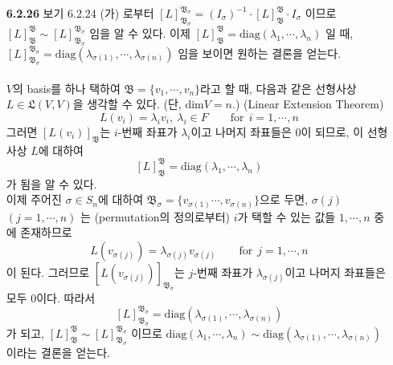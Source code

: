 \documentclass{article}
\newcommand*{\basisB}{\mathfrak{B}}%
\begin{document}
\begin{itemize}
\item[\textbf{6.2.26}] 보기 6.2.24 (가) 로부터 $\left[ L \right]_{\basisB_\sigma}^{\basisB_\sigma} = \left(I_\sigma\right)^{-1} \cdot \left[L\right]_{\basisB}^{\basisB} \cdot I_\sigma$ 이므로 $\left[ L \right]_{\basisB}^{\basisB} \sim  \left[L\right]_{\basisB_\sigma}^{\basisB_\sigma}$ 임을 알 수 있다. 이제 $\left[L\right]_{\basisB}^{\basisB} = \mathrm{diag}(\lambda_1, \cdots, \lambda_n)$ 일 때, $\left[ L \right]_{\basisB_\sigma}^{\basisB_\sigma} = \mathrm{diag}(\lambda_{\sigma(1)}, \cdots, \lambda_{\sigma(n)})$ 임을 보이면 원하는 결론을 얻는다. \\\\
$V$의 basis를 하나 택하여 $\basisB = \{v_1, \cdots, v_n\}$라고 할 때, 다음과 같은 선형사상 $L \in \mathfrak{L}(V, V)$을 생각할 수 있다. (단, $\mathrm{dim}V = n$.) (Linear Extension Theorem)$$L(v_i) = \lambda_iv_i, ~ \lambda_i \in F \qquad \text{for} \:\: i = 1, \cdots, n$$ 
그러면 $\left[L(v_i)\right]_\basisB$는 $i$-번째 좌표가 $\lambda_i$이고 나머지 좌표들은 $0$이 되므로, 이 선형사상 $L$에 대하여 $$\left[L\right]_{\basisB}^{\basisB} = \mathrm{diag}(\lambda_1, \cdots, \lambda_n)$$가 됨을 알 수 있다. \\이제 주어진 $\sigma\in S_n$에 대하여 $\basisB_\sigma = \{v_{\sigma(1)} \cdots, v_{\sigma(n)}\}$으로 두면, $\sigma(j)$ $(j = 1, \cdots, n)$ 는 (permutation의 정의로부터) $i$가 택할 수 있는 값들 $1, \cdots, n$ 중에 존재하므로 $$L(v_{\sigma(j)}) = \lambda_{\sigma(j)} v_{\sigma(j)} \qquad \text{for} \:\: j = 1, \cdots, n$$
이 된다. 그러므로 $\left[L(v_{\sigma(j)})\right]_{\basisB_\sigma}$는 $j$-번째 좌표가 $\lambda_{\sigma(j)}$이고 나머지 좌표들은 모두 $0$이다. 따라서
$$\left[ L \right]_{\basisB_\sigma}^{\basisB_\sigma} = \mathrm{diag}(\lambda_{\sigma(1)}, \cdots, \lambda_{\sigma(n)})$$
가 되고, $\left[ L \right]_{\basisB}^{\basisB} \sim  \left[L\right]_{\basisB_\sigma}^{\basisB_\sigma}$ 이므로 $\mathrm{diag}(\lambda_1, \cdots, \lambda_n) \sim \mathrm{diag}(\lambda_{\sigma(1)}, \cdots, \lambda_{\sigma(n)})$ 이라는 결론을 얻는다.


\end{itemize}
\end{document}
